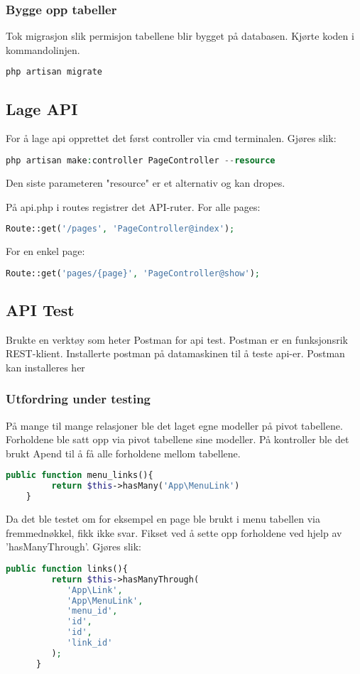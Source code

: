 \subsubsection{Bygge opp tabeller}
Tok migrasjon slik permisjon tabellene blir bygget på databasen.
Kjørte koden i kommandolinjen.
\begin{lstlisting}[language=PHP]
  php artisan migrate
\end{lstlisting}

\subsection{Lage API}
For å lage api opprettet det først controller\cite{laravel2019c} via cmd terminalen.
Gjøres slik:
\begin{lstlisting}[language=PHP]
    php artisan make:controller PageController --resource
\end{lstlisting}
Den siste parameteren "resource" er et alternativ og kan dropes.

På api.php i routes\cite{laravel2019r}  registrer det API-ruter.
For alle pages:
\begin{lstlisting}[language=PHP]
    Route::get('/pages', 'PageController@index');
\end{lstlisting} 
For en enkel page:
\begin{lstlisting}[language=PHP]
    Route::get('pages/{page}', 'PageController@show');
\end{lstlisting}

\subsection{API Test}
Brukte en verktøy som heter Postman for api test. Postman er en funksjonsrik REST-klient\cite{Rathod2017ITP}. Installerte postman på datamaskinen til å teste api-er. Postman kan installeres her\cite{postman2019tocap}
\subsubsection{Utfordring under testing} 
På mange til mange relasjoner ble  det laget egne modeller på pivot tabellene.
Forholdene ble satt opp via pivot tabellene sine modeller. På kontroller ble det brukt  Apend til å få alle forholdene mellom tabellene. 
\begin{lstlisting}[language=PHP]
    public function menu_links(){
         return $this->hasMany('App\MenuLink')
    }
\end{lstlisting}
Da det ble testet om for eksempel en page ble brukt i menu tabellen via fremmednøkkel, fikk ikke svar.
Fikset ved å sette opp forholdene ved hjelp av 'hasManyThrough'. Gjøres slik:
\begin{lstlisting}[language=PHP]
    public function links(){
         return $this->hasManyThrough(    
            'App\Link',
            'App\MenuLink',
            'menu_id',
            'id',
            'id',
            'link_id'
         );
      }
\end{lstlisting}

